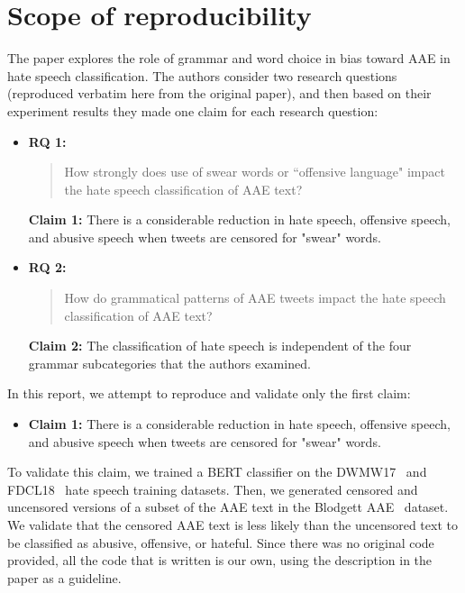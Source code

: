 \section{Scope of reproducibility}
\label{sec:claims}

The paper explores the role of grammar and word choice in bias toward AAE in hate speech classification. The authors consider two research questions (reproduced verbatim here from the original paper), and then based on their experiment results they made one claim for each research question:

\begin{itemize}
    \item \textbf{RQ 1:} \blockquote{How strongly does use of swear words or “offensive language" impact the hate speech classification of AAE text?} \textbf{Claim 1:} There is a considerable reduction in hate speech, offensive speech, and abusive speech when tweets are censored for "swear" words. 
    \item  \textbf{RQ 2:} \blockquote{How do grammatical patterns of AAE tweets impact the hate speech classification of AAE text?} \textbf{Claim 2:} The classification of hate speech is independent of the four grammar subcategories that the authors examined.
\end{itemize}


In this report, we attempt to reproduce and validate only the first claim:
\begin{itemize}
    \item \textbf{Claim 1:} There is a considerable reduction in hate speech, offensive speech, and abusive speech when tweets are censored for "swear" words.
\end{itemize}

To validate this claim, we trained a BERT classifier\cite{bert} on the DWMW17~\cite{davidson} and FDCL18~\cite{founta} hate speech training datasets. Then, we generated censored and uncensored versions of a subset of the AAE text in the Blodgett  AAE~\cite{blodgett} dataset. We validate that the censored AAE text is less likely than the uncensored text to be classified as abusive, offensive, or hateful. Since there was no original code provided, all the code that is written is our own, using the description in the paper as a guideline.
 

